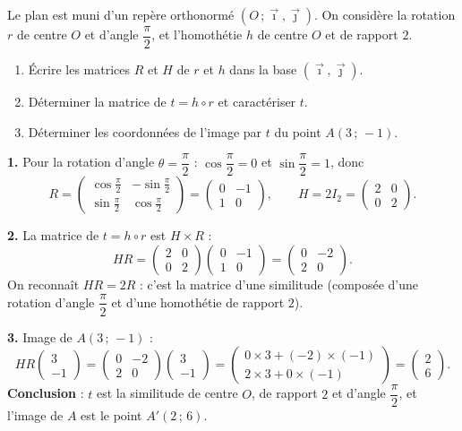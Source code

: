 \documentclass[11pt]{article}
\newcommand{\cle}[1]{{\popxbold\color{popdark}#1}}
\begin{document}
\begin{exoresolu}
Le plan est muni d'un repère orthonormé $(O\,;\vec{\imath},\vec{\jmath})$. On considère la rotation $r$ de centre $O$ et d'angle $\dfrac{\pi}{2}$, et l'homothétie $h$ de centre $O$ et de rapport $2$.
\begin{enumerate}
\item Écrire les matrices $R$ et $H$ de $r$ et $h$ dans la base $(\vec{\imath},\vec{\jmath})$.
\item Déterminer la matrice de $t=h\circ r$ et caractériser $t$.
\item Déterminer les coordonnées de l'image par $t$ du point $A(3\,;\,-1)$.
\end{enumerate}
\tcblower
\textbf{1.} Pour la rotation d'angle $\theta=\dfrac{\pi}{2}$ : $\cos\dfrac{\pi}{2}=0$ et $\sin\dfrac{\pi}{2}=1$, donc
\[ R=\begin{pmatrix} \cos\frac{\pi}{2} & -\sin\frac{\pi}{2} \\ \sin\frac{\pi}{2} & \cos\frac{\pi}{2} \end{pmatrix}=\begin{pmatrix} 0 & -1 \\ 1 & 0 \end{pmatrix}, \qquad H=2I_2=\begin{pmatrix} 2 & 0 \\ 0 & 2 \end{pmatrix}. \]

\textbf{2.} La matrice de $t=h\circ r$ est $H\times R$ :
\[ HR=\begin{pmatrix} 2 & 0 \\ 0 & 2 \end{pmatrix}\begin{pmatrix} 0 & -1 \\ 1 & 0 \end{pmatrix}=\begin{pmatrix} 0 & -2 \\ 2 & 0 \end{pmatrix}. \]
On reconnaît $HR=2R$ : c'est la matrice d'une \cle{similitude} (composée d'une rotation d'angle $\dfrac{\pi}{2}$ et d'une homothétie de rapport $2$).

\textbf{3.} Image de $A(3\,;\,-1)$ :
\[ HR\begin{pmatrix} 3 \\ -1 \end{pmatrix}=\begin{pmatrix} 0 & -2 \\ 2 & 0 \end{pmatrix}\begin{pmatrix} 3 \\ -1 \end{pmatrix}=\begin{pmatrix} 0\times 3+(-2)\times(-1) \\ 2\times 3+0\times(-1) \end{pmatrix}=\begin{pmatrix} 2 \\ 6 \end{pmatrix}. \]
\textbf{Conclusion} : $t$ est la similitude de centre $O$, de rapport $2$ et d'angle $\dfrac{\pi}{2}$, et l'image de $A$ est le point $A'(2\,;\,6)$.
\end{exoresolu}
\end{document}
